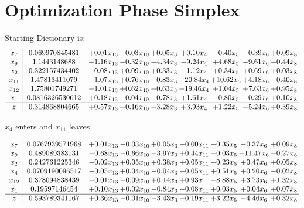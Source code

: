 \documentclass[9pt]{article}
\begin{document}
\section{Optimization Phase Simplex}
Starting Dictionary is:
\[\begin{array}{c| c c@{\hskip 2pt} c@{\hskip 2pt} c@{\hskip 2pt} c@{\hskip 2pt} c@{\hskip 2pt} c@{\hskip 2pt} c@{\hskip 2pt} }
 x_{7}   &  0.069970845481 & +  0.01 x_{13} & -0.03 x_{10} & +  0.05 x_{3} & +  0.10 x_{4} & -0.40 x_{5} & -0.39 x_{6} & +  0.09 x_{8}\\
 x_{9}   &  1.1443148688 & -1.16 x_{13} & -0.32 x_{10} & -4.34 x_{3} & -9.24 x_{4} & +  4.68 x_{5} & -9.61 x_{6} & -0.44 x_{8}\\
 x_{2}   &  0.322157434402 & -0.08 x_{13} & +  0.09 x_{10} & +  0.33 x_{3} & -1.12 x_{4} & +  0.34 x_{5} & +  0.69 x_{6} & +  0.03 x_{8}\\
 x_{11}   &  1.47813411079 & -1.07 x_{13} & +  0.76 x_{10} & -0.83 x_{3} & -20.84 x_{4} & + 10.62 x_{5} & +  4.18 x_{6} & -0.40 x_{8}\\
 x_{12}   &  1.75801749271 & -1.01 x_{13} & +  0.62 x_{10} & -0.63 x_{3} & -19.46 x_{4} & +  1.04 x_{5} & +  7.63 x_{6} & +  0.95 x_{8}\\
 x_{1}   &  0.0816326530612 & +  0.18 x_{13} & -0.04 x_{10} & -0.78 x_{3} & +  1.61 x_{4} & -0.80 x_{5} & -0.29 x_{6} & +  0.10 x_{8}\\
\hline
z    &  0.314868804665 & +  0.57 x_{13} & -0.16 x_{10} & -3.28 x_{3} & +  3.93 x_{4} & +  1.22 x_{5} & -5.24 x_{6} & +  0.39 x_{8}\\
\end{array}\]


 $ x_{4} $ enters and $ x_{11} $ leaves 

 \[\begin{array}{c| c c@{\hskip 2pt} c@{\hskip 2pt} c@{\hskip 2pt} c@{\hskip 2pt} c@{\hskip 2pt} c@{\hskip 2pt} c@{\hskip 2pt} }
 x_{7}   &  0.0767939571968 & +  0.01 x_{13} & -0.03 x_{10} & +  0.05 x_{3} & -0.00 x_{11} & -0.35 x_{5} & -0.37 x_{6} & +  0.09 x_{8}\\
 x_{9}   &  0.489089383131 & -0.68 x_{13} & -0.66 x_{10} & -3.97 x_{3} & +  0.44 x_{11} & -0.03 x_{5} & -11.47 x_{6} & -0.27 x_{8}\\
 x_{2}   &  0.242761225346 & -0.02 x_{13} & +  0.05 x_{10} & +  0.38 x_{3} & +  0.05 x_{11} & -0.23 x_{5} & +  0.47 x_{6} & +  0.05 x_{8}\\
 x_{4}   &  0.0709190096517 & -0.05 x_{13} & +  0.04 x_{10} & -0.04 x_{3} & -0.05 x_{11} & +  0.51 x_{5} & +  0.20 x_{6} & -0.02 x_{8}\\
 x_{12}   &  0.378094838439 & -0.01 x_{13} & -0.09 x_{10} & +  0.14 x_{3} & +  0.93 x_{11} & -8.88 x_{5} & +  3.73 x_{6} & +  1.32 x_{8}\\
 x_{1}   &  0.19597146454 & +  0.10 x_{13} & +  0.02 x_{10} & -0.84 x_{3} & -0.08 x_{11} & +  0.03 x_{5} & +  0.04 x_{6} & +  0.07 x_{8}\\
\hline
z    &  0.593789341167 & +  0.36 x_{13} & -0.01 x_{10} & -3.43 x_{3} & -0.19 x_{11} & +  3.22 x_{5} & -4.46 x_{6} & +  0.32 x_{8}\\
\end{array}\]
\end{document}
